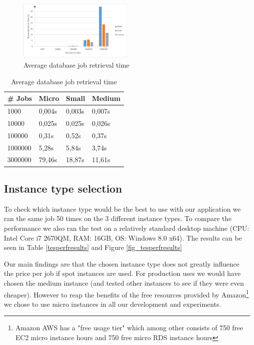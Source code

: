 \documentclass[a4paper]{IEEEtran}
\begin{document}
\begin{figure}
\centering
\includegraphics[width=0.5\textwidth]{"results-database"}
\caption{Average database job retrieval time}
\label{fig_dbperfresults}
\end{figure}

\begin{table}
\centering

\begin{tabular}{| l | l | l | l |}
\hline
\# Jobs & Micro & Small & Medium \\ \hline
1000 & 0,004s &	0,003s & 0,007s \\ \hline
10000 & 0,025s & 0,025s & 0,026s \\ \hline
100000 & 0,31s & 0,52s & 0,37s \\ \hline
1000000 & 5,28s & 5,84s & 3,74s \\ \hline
3000000	& 79,46s & 18,87s & 11,61s \\ \hline
\end{tabular}

\caption{Average database job retrieval time}
\label{dbperfresults}
\end{table}

\subsection{Instance type selection}

To check which instance type would be the best to use with our application we ran the same job 50 times on the 3 different instance types. To compare the performance we also ran the test on a relatively standard desktop machine (CPU: Intel Core i7 2670QM, RAM: 16GB, OS: Windows 8.0 x64). The results can be seen in Table \ref{tesperfresults} and Figure \ref{fig_tesperfresults}

Our main findings are that the chosen instance type does not greatly influence the price per job if spot instances are used. For production uses we would have chosen the medium instance (and tested other instances to see if they were even cheaper). However to reap the benefits of the free resources provided by Amazon\footnote{Amazon AWS has a "free usage tier" which among other consists of 750 free EC2 micro instance hours and 750 free micro RDS instance hours} we chose to use micro instances in all our development and experiments.
\end{document}
